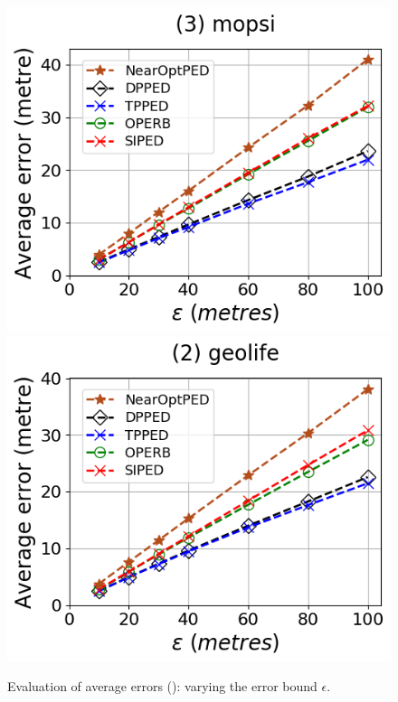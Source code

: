 \begin{figure}[tb!]
	\includegraphics[scale=0.315]{Figures/Exp-PED-error-epsilon-mopsi.png}	\hspace{1ex}
	\includegraphics[scale=0.315]{Figures/Exp-PED-error-epsilon-geolife.png} 
	\vspace{-2.5ex}
	\caption{\small Evaluation of average errors (\ped): varying the error bound $\epsilon$.}
	\label{fig:ae-ped}
	\vspace{-1ex}
\end{figure}

